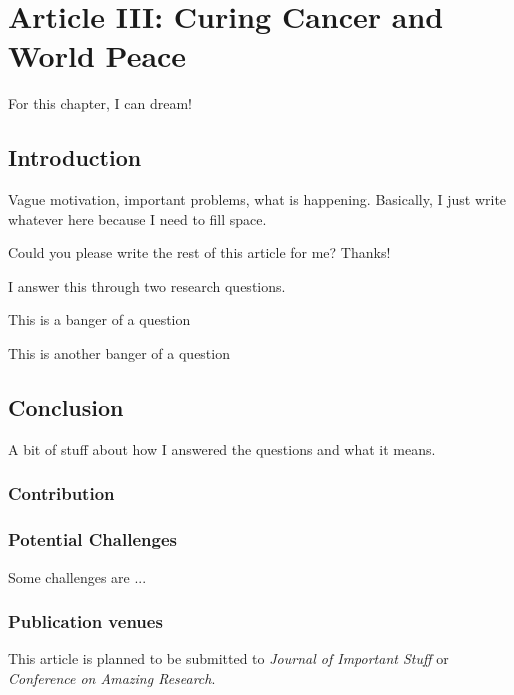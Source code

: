 \chapter{Article III: Curing Cancer and World Peace} \label{sec:article_2_main}
\begin{researchbox}
    For this chapter, I can dream!
\end{researchbox}


\section{Introduction} \label{ch2:sec:introduction}
Vague motivation, important problems, what is happening. Basically, I just write whatever here because I need to fill space.

Could you please write the rest of this article for me? Thanks!


I answer this through two research questions.


This is a banger of a question


This is another banger of a question

\section{Conclusion}
A bit of stuff about how I answered the questions and what it means.

\subsection{Contribution}

\subsection{Potential Challenges}
Some challenges are ...


\subsection{Publication venues}
This article is planned to be submitted to \textit{Journal of Important Stuff} or \textit{Conference on Amazing Research}.






